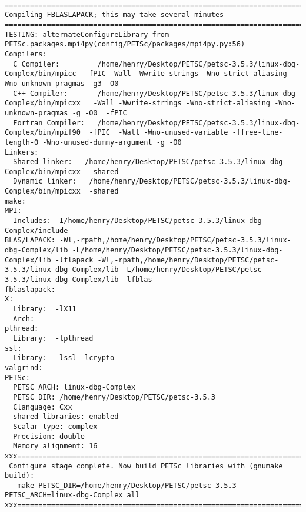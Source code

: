 \documentclass{article}
\begin{document}
\begin{scriptsize}
\begin{verbatim}
                                                                            ===============================================================================                                                                                                        Compiling FBLASLAPACK; this may take several minutes                                                                                                                       ===============================================================================                                                                                                  TESTING: alternateConfigureLibrary from PETSc.packages.mpi4py(config/PETSc/packages/mpi4py.py:56)                                                                                Compilers:
  C Compiler:         /home/henry/Desktop/PETSC/petsc-3.5.3/linux-dbg-Complex/bin/mpicc  -fPIC -Wall -Wwrite-strings -Wno-strict-aliasing -Wno-unknown-pragmas -g3 -O0 
  C++ Compiler:       /home/henry/Desktop/PETSC/petsc-3.5.3/linux-dbg-Complex/bin/mpicxx   -Wall -Wwrite-strings -Wno-strict-aliasing -Wno-unknown-pragmas -g -O0  -fPIC  
  Fortran Compiler:   /home/henry/Desktop/PETSC/petsc-3.5.3/linux-dbg-Complex/bin/mpif90  -fPIC  -Wall -Wno-unused-variable -ffree-line-length-0 -Wno-unused-dummy-argument -g -O0 
Linkers:
  Shared linker:   /home/henry/Desktop/PETSC/petsc-3.5.3/linux-dbg-Complex/bin/mpicxx  -shared
  Dynamic linker:   /home/henry/Desktop/PETSC/petsc-3.5.3/linux-dbg-Complex/bin/mpicxx  -shared
make:
MPI:
  Includes: -I/home/henry/Desktop/PETSC/petsc-3.5.3/linux-dbg-Complex/include
BLAS/LAPACK: -Wl,-rpath,/home/henry/Desktop/PETSC/petsc-3.5.3/linux-dbg-Complex/lib -L/home/henry/Desktop/PETSC/petsc-3.5.3/linux-dbg-Complex/lib -lflapack -Wl,-rpath,/home/henry/Desktop/PETSC/petsc-3.5.3/linux-dbg-Complex/lib -L/home/henry/Desktop/PETSC/petsc-3.5.3/linux-dbg-Complex/lib -lfblas
fblaslapack:
X:
  Library:  -lX11
  Arch:     
pthread:
  Library:  -lpthread
ssl:
  Library:  -lssl -lcrypto
valgrind:
PETSc:
  PETSC_ARCH: linux-dbg-Complex
  PETSC_DIR: /home/henry/Desktop/PETSC/petsc-3.5.3
  Clanguage: Cxx
  shared libraries: enabled
  Scalar type: complex
  Precision: double
  Memory alignment: 16
xxx=========================================================================xxx
 Configure stage complete. Now build PETSc libraries with (gnumake build):
   make PETSC_DIR=/home/henry/Desktop/PETSC/petsc-3.5.3 PETSC_ARCH=linux-dbg-Complex all
xxx=========================================================================xxx 
\end{verbatim}              \end{scriptsize}
\end{document}
